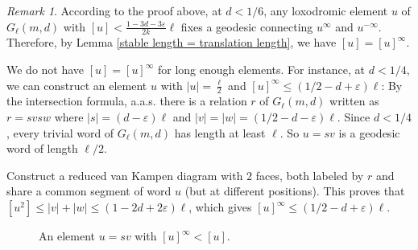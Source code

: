 \documentclass[a4paper]{article}
\theoremstyle{remark}
\newtheorem{rem}[thm]{Remark}
\begin{document}
\quad

\begin{rem}\label{rem stable length}
    According to the proof above, at $d<1/6$, any loxodromic element $u$ of $G_\ell(m,d)$ with $[u]<\frac{1-3d-3\varepsilon}{2k}\ell$ fixes a geodesic connecting $u^\infty$ and $u^{-\infty}$. Therefore, by Lemma \ref{stable length = translation length}, we have $[u]=[u]^\infty$.

    We do not have $[u]=[u]^\infty$ for long enough elements. For instance, at $d<1/4$, we can construct an element $u$ with $|u|=\frac{\ell}{2}$ and $[u]^\infty\leq (1/2-d+\varepsilon)\ell$: By the intersection formula, a.a.s. there is a relation $r$ of $G_\ell(m,d)$ written as $r = svsw$ where $|s|=(d-\varepsilon)\ell$ and $|v|=|w|=(1/2-d-\varepsilon)\ell$. Since $d<1/4$, every trivial word of $G_\ell(m,d)$ has length at least $\ell$. So $u = sv$ is a geodesic word of length $\ell/2$.

    Construct a reduced van Kampen diagram with $2$ faces, both labeled by $r$ and share a common segment of word $u$ (but at different positions). This proves that $[u^2]\leq |v|+|w|\leq (1-2d+2\varepsilon)\ell$, which gives $[u]^\infty\leq (1/2-d+\varepsilon)\ell$.
    
    \begin{figure}[h]
\begin{center}
\end{center}
    \caption{An element $u = sv$ with $[u]^\infty < [u]$.}
\end{figure}
\end{rem}


\printbibliography[heading=bibintoc]
\end{document}
